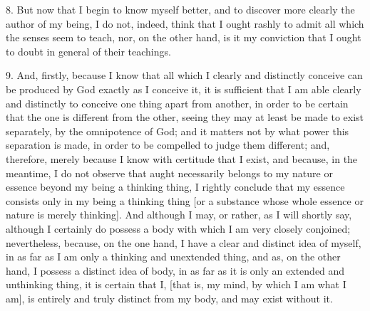 8. But now that I begin to know myself better, and to discover more clearly the author of my being, I do not, indeed, think that I ought rashly to admit all which the senses seem to teach, nor, on the other hand, is it my conviction that I ought to doubt in general of their teachings.

9. And, firstly, because I know that all which I clearly and distinctly conceive can be produced by God exactly as I conceive it, it is sufficient that I am able clearly and distinctly to conceive one thing apart from another, in order to be certain that the one is different from the other, seeing they may at least be made to exist separately, by the omnipotence of God; and it matters not by what power this separation is made, in order to be compelled to judge them different; and, therefore, merely because I know with certitude that I exist, and because, in the meantime, I do not observe that aught necessarily belongs to my nature or essence beyond my being a thinking thing, I rightly conclude that my essence consists only in my being a thinking thing [or a substance whose whole essence or nature is merely thinking]. And although I may, or rather, as I will shortly say, although I certainly do possess a body with which I am very closely conjoined; nevertheless, because, on the one hand, I have a clear and distinct idea of myself, in as far as I am only a thinking and unextended thing, and as, on the other hand, I possess a distinct idea of body, in as far as it is only an extended and unthinking thing, it is certain that I, [that is, my mind, by which I am what I am], is entirely and truly distinct from my body, and may exist without it.

